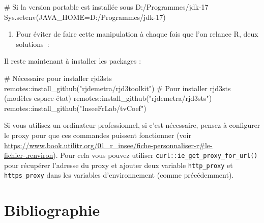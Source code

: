 \documentclass[
  a4paper,
  DIV=11,
  numbers=noendperiod,
  french]{scrartcl}
\newcommand{\VERB}{\Verb[commandchars=\\\{\}]}
\newenvironment{Shaded}{\begin{snugshade}}{\end{snugshade}}
\newcommand{\AttributeTok}[1]{\textcolor[rgb]{0.40,0.45,0.13}{#1}}
\newcommand{\CommentTok}[1]{\textcolor[rgb]{0.37,0.37,0.37}{#1}}
\newcommand{\FunctionTok}[1]{\textcolor[rgb]{0.28,0.35,0.67}{#1}}
\newcommand{\NormalTok}[1]{\textcolor[rgb]{0.00,0.23,0.31}{#1}}
\newcommand{\SpecialCharTok}[1]{\textcolor[rgb]{0.37,0.37,0.37}{#1}}
\newcommand{\StringTok}[1]{\textcolor[rgb]{0.13,0.47,0.30}{#1}}
\providecommand{\tightlist}{%
  \setlength{\itemsep}{0pt}\setlength{\parskip}{0pt}}\usepackage{longtable,booktabs,array}
\newcommand\1{{\mathds 1}}
\theoremstyle{remark}
\begin{document}
\begin{Shaded}
\begin{Highlighting}[]
\CommentTok{\# Si la version portable est installée sous D:/Programmes/jdk{-}17}
\FunctionTok{Sys.setenv}\NormalTok{(}\AttributeTok{JAVA\_HOME=}\StringTok{\textquotesingle{}D:/Programmes/jdk{-}17\textquotesingle{}}\NormalTok{)}
\end{Highlighting}
\end{Shaded}

\begin{enumerate}
\def\labelenumi{\arabic{enumi}.}
\setcounter{enumi}{1}
\tightlist
\item
  Pour éviter de faire cette manipulation à chaque fois que l'on relance
  R, deux solutions~:
\end{enumerate}


Il reste maintenant à installer les packages :

\begin{Shaded}
\begin{Highlighting}[]
\CommentTok{\# Nécessaire pour installer rjd3sts}
\NormalTok{remotes}\SpecialCharTok{::}\FunctionTok{install\_github}\NormalTok{(}\StringTok{"rjdemetra/rjd3toolkit"}\NormalTok{)}
\CommentTok{\# Pour installer rjd3sts (modèles espace{-}état)}
\NormalTok{remotes}\SpecialCharTok{::}\FunctionTok{install\_github}\NormalTok{(}\StringTok{"rjdemetra/rjd3sts"}\NormalTok{)}
\NormalTok{remotes}\SpecialCharTok{::}\FunctionTok{install\_github}\NormalTok{(}\StringTok{"InseeFrLab/tvCoef"}\NormalTok{)}
\end{Highlighting}
\end{Shaded}

Si vous utilisez un ordinateur professionnel, si c'est nécessaire,
pensez à configurer le proxy pour que ces commandes puissent fonctionner
(voir
\url{https://www.book.utilitr.org/01_r_insee/fiche-personnaliser-r\#le-fichier-.renviron}).
Pour cela vous pouvez utiliser \texttt{curl::ie\_get\_proxy\_for\_url()}
pour récupérer l'adresse du proxy et ajouter deux variable
\texttt{http\_proxy} et \texttt{https\_proxy} dans les variables
d'environnement (comme précédemment).

\section*{Bibliographie}\label{bibliographie}

\printbibliography[heading=none]
\end{document}
